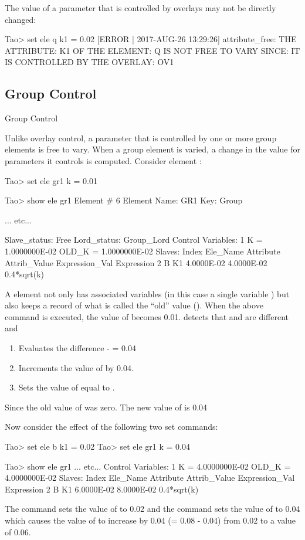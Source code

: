 \documentclass{hitec}
\begin{document}
The value of a parameter that is controlled by overlays may not be directly changed:
\begin{code}
Tao> set ele q k1 = 0.02
[ERROR | 2017-AUG-26 13:29:26] attribute_free:
    THE ATTRIBUTE: K1
    OF THE ELEMENT: Q
    IS NOT FREE TO VARY SINCE:
    IT IS CONTROLLED BY THE OVERLAY: OV1
\end{code}

\subsection{Group Control}

Group Control

Unlike overlay control, a parameter that is controlled by one or more group elements is free to vary.
When a group element is varied, a change in the value for parameters it controls is computed.
Consider  element :
\begin{code} 
Tao> set ele gr1 k = 0.01

Tao> show ele gr1
 Element #                6
 Element Name: GR1
 Key: Group

... etc...    

Slave_status: Free
Lord_status:  Group_Lord
Control Variables:
    1   K  =  1.0000000E-02           OLD_K  =  1.0000000E-02
Slaves:
   Index   Ele_Name  Attribute   Attrib_Value  Expression_Val    Expression
       2   B         K1            4.0000E-02      4.0000E-02    0.4*sqrt(k)
\end{code}
A  element not only has associated variables (in this case a single variable ) but
\bmad also keeps a record of what is called the ``old'' value (). When the above  command is executed, the value of  becomes 0.01. \bmad detects that 
and  are different and
\begin{enumerate}
\item
Evaluates the difference  -  = 0.04
\item
Increments the value of  by 0.04.
\item
Sets the value of  equal to .
\end{enumerate}
Since the old value of  was zero. The new value of  is 0.04

Now consider the effect of the following two set commands:
\begin{code}
Tao> set ele b k1 = 0.02
Tao> set ele gr1 k = 0.04

Tao> show ele gr1
... etc...
Control Variables:
    1   K  =  4.0000000E-02           OLD_K  =  4.0000000E-02
Slaves:
   Index   Ele_Name  Attribute   Attrib_Value  Expression_Val    Expression
       2   B         K1            6.0000E-02      8.0000E-02    0.4*sqrt(k)
\end{code}
The  command sets the value of  to 0.02 and the  command
sets the value of  to 0.04 which causes the value of  to increase by 0.04 (=
0.08 - 0.04) from 0.02 to a value of 0.06.
\end{document}
